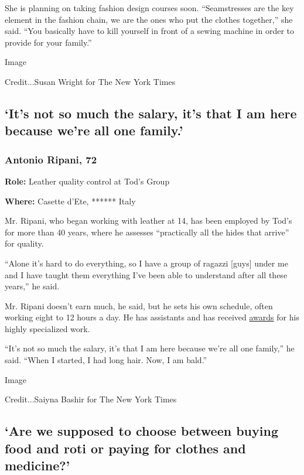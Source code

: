 She is planning on taking fashion design courses soon. ``Seamstresses
are the key element in the fashion chain, we are the ones who put the
clothes together,'' she said. ``You basically have to kill yourself in
front of a sewing machine in order to provide for your family.''

Image

Credit...Susan Wright for The New York Times

\hypertarget{its-not-so-much-the-salary-its-that-i-am-here-because-were-all-one-family}{%
\subsection{`It's not so much the salary, it's that I am here because
we're all one
family.'}\label{its-not-so-much-the-salary-its-that-i-am-here-because-were-all-one-family}}

\hypertarget{antonio-ripani-72}{%
\subsubsection{Antonio Ripani, 72}\label{antonio-ripani-72}}

\textbf{Role:} Leather quality control at Tod's Group

\textbf{Where:} Casette d'Ete, ****** Italy

Mr. Ripani, who began working with leather at 14, has been employed by
Tod's for more than 40 years, where he assesses ``practically all the
hides that arrive'' for quality.

``Alone it's hard to do everything, so I have a group of ragazzi
{[}guys{]} under me and I have taught them everything I've been able to
understand after all these years,'' he said.

Mr. Ripani doesn't earn much, he said, but he sets his own schedule,
often working eight to 12 hours a day. He has assistants and has
received
\href{https://www.corriereadriatico.it/fermo/fermo_cesetti_provincia_tod_39_s-469005.html}{awards}
for his highly specialized work.

``It's not so much the salary, it's that I am here because we're all one
family,'' he said. ``When I started, I had long hair. Now, I am bald.''

Image

Credit...Saiyna Bashir for The New York Times

\hypertarget{are-we-supposed-to-choose-between-buying-food-and-roti-or-paying-for-clothes-and-medicine}{%
\subsection{`Are we supposed to choose between buying food and roti or
paying for clothes and
medicine?'}\label{are-we-supposed-to-choose-between-buying-food-and-roti-or-paying-for-clothes-and-medicine}}

